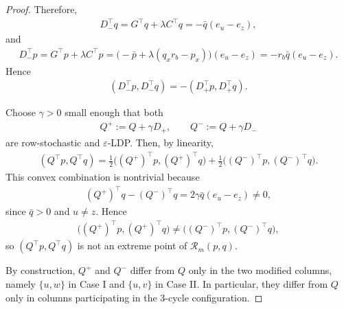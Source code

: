 \documentclass[10pt,a4paper]{amsart}
\begin{document}
\begin{proof}
Therefore,
\begin{align*}
    D_-^\top q=G^\top q+\lambda C^\top q=-\bar q(e_u-e_z),
\end{align*}
and
\begin{align*}
    D_-^\top p
    =
    G^\top p+\lambda C^\top p
    =
    \bigl(-\bar p+\lambda(q_xr_b-p_x)\bigr)(e_u-e_z)
    =
    -r_b\bar q(e_u-e_z).
\end{align*}
Hence
\begin{align*}
    (D_-^\top p,D_-^\top q)=-(D_+^\top p,D_+^\top q).
\end{align*}

Choose $\gamma>0$ small enough that both
\begin{align*}
    Q^+:=Q+\gamma D_+,
    \qquad
    Q^-:=Q+\gamma D_-
\end{align*}
are row-stochastic and $\varepsilon$-LDP. Then, by linearity,
\begin{align*}
    (Q^\top p,Q^\top q)
    =
    \frac12\bigl((Q^+)^\top p,(Q^+)^\top q\bigr)
    +
    \frac12\bigl((Q^-)^\top p,(Q^-)^\top q\bigr).
\end{align*}
This convex combination is nontrivial because
\begin{align*}
    (Q^+)^\top q-(Q^-)^\top q
    =
    2\gamma\bar q(e_u-e_z)\neq 0,
\end{align*}
since $\bar q>0$ and $u\neq z$. Hence
\begin{align*}
    \bigl((Q^+)^\top p,(Q^+)^\top q\bigr)
    \neq
    \bigl((Q^-)^\top p,(Q^-)^\top q\bigr),
\end{align*}
so $(Q^\top p,Q^\top q)$ is not an extreme point of $\mathcal R_m(p,q)$.

By construction, $Q^+$ and $Q^-$ differ from $Q$ only in the two modified columns, namely $\{u,w\}$ in Case I and $\{u,v\}$ in Case II. In particular, they differ from $Q$ only in columns participating in the $3$-cycle configuration.
\end{proof}
\end{document}
